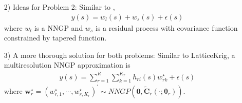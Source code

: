 \documentclass[
12pt, %
a4paper, %
oneside, %
headinclude,footinclude, %
BCOR5mm, %
]{scrartcl}
\begin{document}
\begin{itemize}
 \item [2)] Ideas for Problem 2: Similar to \href{https://chenyw68.github.io/Literature/[2012]A full scale approximation of covariance functions for large spatial data sets.pdf}{\cite{sang2012full}},
\begin{equation}
    \begin{aligned}
       y(s) = w_l(s) + w_s(s) + \epsilon(s)
    \end{aligned} \label{DP1}
\end{equation}
where $w_l$ is a NNGP and $w_s$ is a residual process with covariance function constrained by tapered function.
 \item [3)] A more thorough solution for both problems: Similar to LatticeKrig, a multiresolution NNGP approximation is
 \begin{equation}
\begin{aligned}
y(s) = \sum_{r = 1}^{R}\sum_{k = 1}^{K_r}h_{ri}(s)w_{rk}^{\star}  + \epsilon(s)
\end{aligned} \label{DP1}
\end{equation}
where $\boldsymbol{w}_r^{\star} = \left(w_{r, 1}^{\star}, \cdots, w_{r, K_r}^{\star}\right)^\prime \sim NNGP\left(\boldsymbol{0}, \boldsymbol{\tilde{C}}_r(\cdot; \boldsymbol{\theta}_r)\right)$.
\end{itemize}

%

\end{document}
